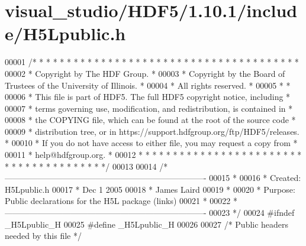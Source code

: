 \hypertarget{visual__studio_2_h_d_f5_21_810_81_2include_2_h5_lpublic_8h_source}{}\section{visual\+\_\+studio/\+H\+D\+F5/1.10.1/include/\+H5\+Lpublic.h}
\label{visual__studio_2_h_d_f5_21_810_81_2include_2_h5_lpublic_8h_source}

\begin{DoxyCode}
00001 \textcolor{comment}{/* * * * * * * * * * * * * * * * * * * * * * * * * * * * * * * * * * * * * * *}
00002 \textcolor{comment}{ * Copyright by The HDF Group.                                               *}
00003 \textcolor{comment}{ * Copyright by the Board of Trustees of the University of Illinois.         *}
00004 \textcolor{comment}{ * All rights reserved.                                                      *}
00005 \textcolor{comment}{ *                                                                           *}
00006 \textcolor{comment}{ * This file is part of HDF5.  The full HDF5 copyright notice, including     *}
00007 \textcolor{comment}{ * terms governing use, modification, and redistribution, is contained in    *}
00008 \textcolor{comment}{ * the COPYING file, which can be found at the root of the source code       *}
00009 \textcolor{comment}{ * distribution tree, or in https://support.hdfgroup.org/ftp/HDF5/releases.  *}
00010 \textcolor{comment}{ * If you do not have access to either file, you may request a copy from     *}
00011 \textcolor{comment}{ * help@hdfgroup.org.                                                        *}
00012 \textcolor{comment}{ * * * * * * * * * * * * * * * * * * * * * * * * * * * * * * * * * * * * * * */}
00013 
00014 \textcolor{comment}{/*-------------------------------------------------------------------------}
00015 \textcolor{comment}{ *}
00016 \textcolor{comment}{ * Created:             H5Lpublic.h}
00017 \textcolor{comment}{ *                      Dec 1 2005}
00018 \textcolor{comment}{ *                      James Laird}
00019 \textcolor{comment}{ *}
00020 \textcolor{comment}{ * Purpose:             Public declarations for the H5L package (links)}
00021 \textcolor{comment}{ *}
00022 \textcolor{comment}{ *-------------------------------------------------------------------------}
00023 \textcolor{comment}{ */}
00024 \textcolor{preprocessor}{#ifndef \_H5Lpublic\_H}
00025 \textcolor{preprocessor}{#define \_H5Lpublic\_H}
00026 
00027 \textcolor{comment}{/* Public headers needed by this file */}

\end{DoxyCode}
